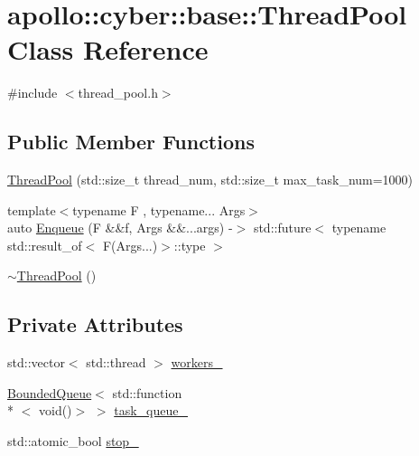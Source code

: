 \hypertarget{classapollo_1_1cyber_1_1base_1_1ThreadPool}{\section{apollo\-:\-:cyber\-:\-:base\-:\-:Thread\-Pool Class Reference}
\label{classapollo_1_1cyber_1_1base_1_1ThreadPool}
}


{\ttfamily \#include $<$thread\-\_\-pool.\-h$>$}

\subsection*{Public Member Functions}
\begin{DoxyCompactItemize}
\item 
\hyperlink{classapollo_1_1cyber_1_1base_1_1ThreadPool_a2f100617db396e84a85d3b73e0a8445e}{Thread\-Pool} (std\-::size\-\_\-t thread\-\_\-num, std\-::size\-\_\-t max\-\_\-task\-\_\-num=1000)
\item 
{\footnotesize template$<$typename F , typename... Args$>$ }\\auto \hyperlink{classapollo_1_1cyber_1_1base_1_1ThreadPool_afbec0b11f01e3104a25b6a4d6c4187fa}{Enqueue} (F \&\&f, Args \&\&...args) -\/$>$ std\-::future$<$ typename std\-::result\-\_\-of$<$ F(Args...)$>$\-::type $>$
\item 
\hyperlink{classapollo_1_1cyber_1_1base_1_1ThreadPool_a3471298c5bba16696124d7be5d4d3982}{$\sim$\-Thread\-Pool} ()
\end{DoxyCompactItemize}
\subsection*{Private Attributes}
\begin{DoxyCompactItemize}
\item 
std\-::vector$<$ std\-::thread $>$ \hyperlink{classapollo_1_1cyber_1_1base_1_1ThreadPool_acced081f4cd5b01eb8fc445d5c628ca6}{workers\-\_\-}
\item 
\hyperlink{classapollo_1_1cyber_1_1base_1_1BoundedQueue}{Bounded\-Queue}$<$ std\-::function\\*
$<$ void()$>$ $>$ \hyperlink{classapollo_1_1cyber_1_1base_1_1ThreadPool_a8a22cf996a6d9584df9b134fbefc8871}{task\-\_\-queue\-\_\-}
\item 
std\-::atomic\-\_\-bool \hyperlink{classapollo_1_1cyber_1_1base_1_1ThreadPool_a3ac78b38d2357e302782b269eb418a13}{stop\-\_\-}
\end{DoxyCompactItemize}



